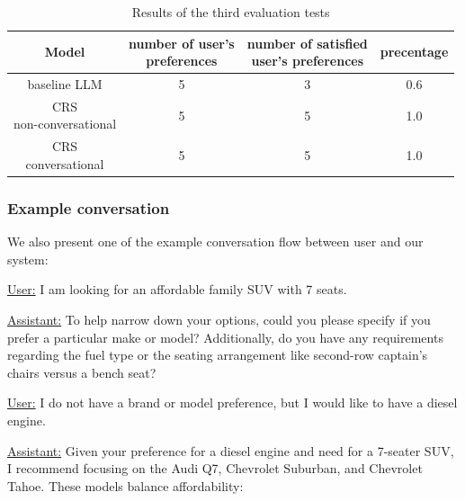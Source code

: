 \documentclass[fleqn,moreauthors,10pt]{ds_report}
\begin{document}
\begin{table}[H]
\resizebox{1.0 \linewidth}{!}
{\begin{tabular}{| c | c c c  |}

\hline
Model & \makecell{number of user's \\ preferences} & \makecell{number of satisfied \\ user's preferences} & precentage \\ 
\hline
baseline LLM  &  5 &  3 & 0.6  \\
\hline
\makecell{CRS \\ non-conversational}  &  5 &  5 & 1.0  \\
\hline
\makecell{CRS \\ conversational}   &  5 &  5 & 1.0  \\
\hline

\end{tabular}}
\caption{
    Results of the third evaluation tests
}
\label{tab:CRS results constraints}
\end{table}
\FloatBarrier







\subsubsection*{Example conversation}

We also present one of the example conversation flow 
between user and our system:

\vspace{3pt}
\noindent
\underline{User:} I am looking for an affordable family SUV with 7 seats.

\noindent
\underline{Assistant:} To help narrow down your options, could you please specify if you prefer a particular make or model? Additionally, do you have any requirements regarding the fuel type or the seating arrangement like second-row captain's chairs versus a bench seat?

\vspace{3pt}
\noindent
\underline{User:} I do not have a brand or model preference, but I would like to have a diesel engine.

\noindent
\underline{Assistant:} 
Given your preference for a diesel engine and need for a 7-seater SUV, I recommend focusing 
on the Audi Q7, Chevrolet Suburban, and Chevrolet Tahoe. These models balance affordability:
\end{document}
